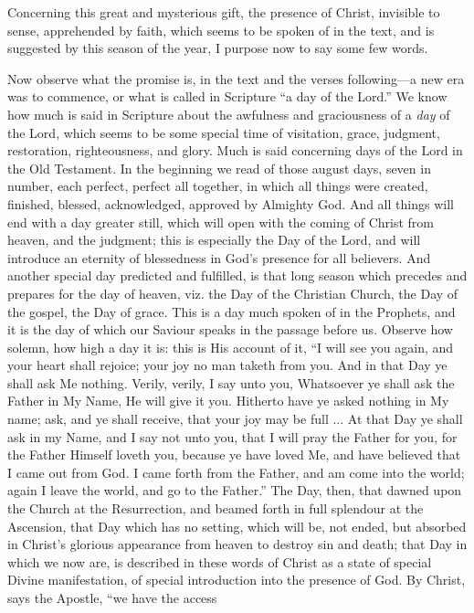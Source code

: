 Concerning this great and mysterious gift, the presence of Christ,
invisible to sense, apprehended by faith, which seems to be spoken of in
the text, and is suggested by this season of the year, I purpose now to
say some few words.

Now observe what the promise is, in the text and the verses following—a
new era was to commence, or what is called in Scripture ``a day of
the Lord.'' We know how much is said in Scripture about the
awfulness and graciousness of a \emph{day} of the Lord, which seems to
be some special time of visitation, grace, judgment, restoration,
righteousness, and glory. Much is said concerning days of the Lord in
the Old Testament. In the beginning we read of those august days, seven
in number, each perfect, perfect all together, in which all things were
created, finished, blessed, acknowledged, approved by Almighty God. And
all things will end with a day greater still, which will open with the
coming of Christ from heaven, and the judgment; this is especially the
Day of the Lord, and will introduce an eternity of blessedness in God's
presence for all believers. And another special day predicted and
fulfilled, is that long season which precedes and prepares for the day
of heaven, viz. the Day of the Christian Church, the Day of the gospel,
the Day of grace. This is a day much spoken of in the Prophets, and it
is the day of which our Saviour speaks in the passage before us. Observe
how solemn, how high a day it is: this is His account of it, ``I
will see you again, and your heart shall rejoice; your joy no man taketh
from you. And in that Day ye shall ask Me nothing. Verily, verily, I say
unto you, Whatsoever ye shall ask the Father in My Name, He will give it
you. Hitherto have ye asked nothing in My name; ask, and ye shall
receive, that your joy may be full ... At that Day ye shall ask in my
Name, and I say not unto you, that I will pray the Father for you, for
the Father Himself loveth you, because ye have loved Me, and have
believed that I came out from God. I came forth from the Father, and am
come into the world; again I leave the world, and go to the
Father.'' The Day, then, that dawned upon the Church at the
Resurrection, and beamed forth in full splendour at the Ascension, that
Day which has no setting, which will be, not ended, but absorbed in
Christ's glorious appearance from heaven to destroy sin and death; that
Day in which we now are, is described in these words of Christ as a
state of special Divine manifestation, of special introduction into the
presence of God. By Christ, says the Apostle, ``we have the access
